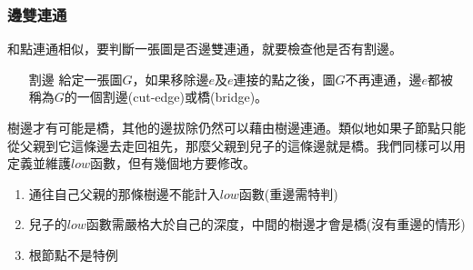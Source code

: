 \subsubsection{邊雙連通}
和點連通相似，要判斷一張圖是否邊雙連通，就要檢查他是否有割邊。
\begin{enumerate}
\item [割邊] 給定一張圖$G$，如果移除邊$e$及$e$連接的點之後，圖$G$不再連通，邊$e$都被稱為$G$的一個割邊(cut-edge)或橋(bridge)。
\end{enumerate}
樹邊才有可能是橋，其他的邊拔除仍然可以藉由樹邊連通。類似地如果子節點只能從父親到它這條邊去走回祖先，那麼父親到兒子的這條邊就是橋。我們同樣可以用定義並維護$low$函數，但有幾個地方要修改。
\begin{enumerate}
\item 通往自己父親的那條樹邊不能計入$low$函數(重邊需特判)
\item 兒子的$low$函數需嚴格大於自己的深度，中間的樹邊才會是橋(沒有重邊的情形)
\item 根節點不是特例
\end{enumerate}